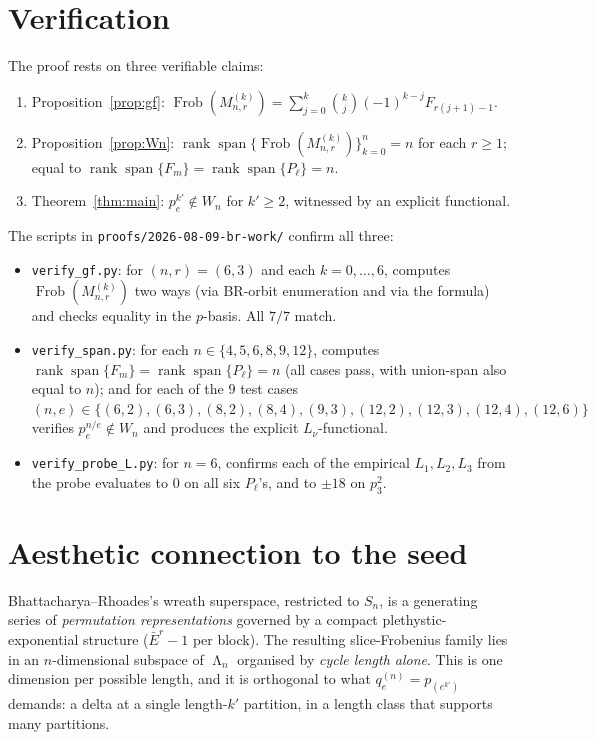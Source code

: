 \documentclass[11pt]{article}
\theoremstyle{definition}
\DeclareMathOperator{\Frob}{Frob}
\DeclareMathOperator{\Lam}{\Lambda}
\DeclareMathOperator{\rank}{rank}
\DeclareMathOperator{\spann}{span}
\newcommand{\bE}{\bar{E}}
\begin{document}
\section{Verification}

The proof rests on three verifiable claims:
\begin{enumerate}[label=(V\arabic*)]
\item Proposition~\ref{prop:gf}: $\Frob(M_{n,r}^{(k)})=\sum_{j=0}^k\binom{k}{j}(-1)^{k-j}F_{r(j+1)-1}$.
\item Proposition~\ref{prop:Wn}: $\rank\spann\{\Frob(M_{n,r}^{(k)})\}_{k=0}^n=n$
      for each $r\ge 1$; equal to $\rank\spann\{F_m\}=\rank\spann\{P_\ell\}=n$.
\item Theorem~\ref{thm:main}: $p_e^{k'}\notin W_n$ for $k'\ge 2$, witnessed
      by an explicit functional.
\end{enumerate}
\noindent
The scripts in \verb|proofs/2026-08-09-br-work/| confirm all three:
\begin{itemize}
\item \verb|verify_gf.py|: for $(n,r)=(6,3)$ and each $k=0,\dots,6$,
       computes $\Frob(M_{n,r}^{(k)})$ two ways (via BR-orbit enumeration
       and via the formula) and checks equality in the $p$-basis. All
       $7/7$ match.
\item \verb|verify_span.py|: for each $n\in\{4,5,6,8,9,12\}$, computes
       $\rank\spann\{F_m\}=\rank\spann\{P_\ell\}=n$ (all cases pass, with
       union-span also equal to $n$); and for each of the $9$ test cases
       $(n,e)\in\{(6,2),(6,3),(8,2),(8,4),(9,3),(12,2),(12,3),(12,4),(12,6)\}$
       verifies $p_e^{n/e}\notin W_n$ and produces the explicit
       $L_\nu$-functional.
\item \verb|verify_probe_L.py|: for $n=6$, confirms each of the empirical
       $L_1,L_2,L_3$ from the probe evaluates to $0$ on all six $P_\ell$'s,
       and to $\pm 18$ on $p_3^2$.
\end{itemize}

\section*{Aesthetic connection to the seed}

Bhattacharya--Rhoades's wreath superspace, restricted to $S_n$, is a
generating series of \emph{permutation representations} governed by a
compact plethystic-exponential structure ($\bE^r-1$ per block). The
resulting slice-Frobenius family lies in an $n$-dimensional subspace of
$\Lam_n$ organised by \emph{cycle length alone}. This is one dimension per
possible length, and it is orthogonal to what $q_e^{(n)}=p_{(e^{k'})}$
demands: a delta at a single length-$k'$ partition, in a length class that
supports many partitions.
\end{document}

